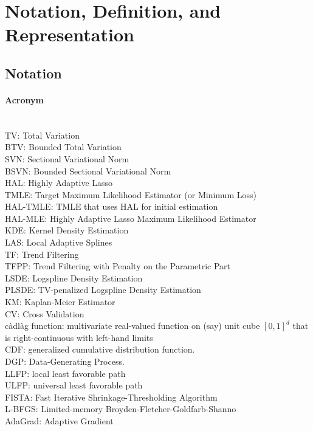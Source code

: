 \section{Notation, Definition, and Representation} \label{Appendix A: Notation, Definition}
\subsection{Notation}
\paragraph{Acronym}~\\
TV: Total Variation \\
BTV: Bounded Total Variation \\
SVN: Sectional Variational Norm \\
BSVN: Bounded Sectional Variational Norm \\
HAL: Highly Adaptive Lasso \\
TMLE: Target Maximum Likelihood Estimator (or Minimum Loss)\\
HAL-TMLE: TMLE that uses HAL for initial estimation \\
HAL-MLE: Highly Adaptive Lasso Maximum Likelihood Estimator \\
KDE: Kernel Density Estimation \\
LAS: Local Adaptive Splines \\
TF: Trend Filtering \\
TFPP: Trend Filtering with Penalty on the Parametric Part \\
LSDE: Logspline Density Estimation \\
PLSDE: TV-penalized Logspline Density Estimation \\
KM: Kaplan-Meier Estimator \\
CV: Cross Validation \\
càdlàg function: multivariate real-valued function on (say) unit cube $[0, 1]^d$ that is right-continuous with left-hand limits \\
CDF: generalized cumulative distribution function.\\
DGP: Data-Generating Process. \\
LLFP: local least favorable path \\
ULFP: universal least favorable path \\
FISTA: Fast Iterative Shrinkage-Thresholding Algorithm \\
L-BFGS: Limited-memory Broyden-Fletcher-Goldfarb-Shanno \\
AdaGrad: Adaptive Gradient \\


